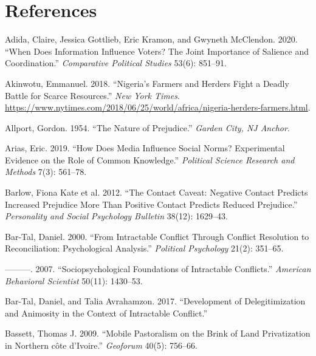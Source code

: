 \documentclass[11pt]{article}
\begin{document}
\hypertarget{references}{%
\section*{References}\label{references}}

\hypertarget{refs}{}
\begin{cslreferences}
\leavevmode\hypertarget{ref-adida2020does}{}%
Adida, Claire, Jessica Gottlieb, Eric Kramon, and Gwyneth McClendon.
2020. ``When Does Information Influence Voters? The Joint Importance of
Salience and Coordination.'' \emph{Comparative Political Studies} 53(6):
851--91.

\leavevmode\hypertarget{ref-nyt2018nigeria}{}%
Akinwotu, Emmanuel. 2018. ``Nigeria's Farmers and Herders Fight a Deadly
Battle for Scarce Resources.'' \emph{New York Times}.
\url{https://www.nytimes.com/2018/06/25/world/africa/nigeria-herders-farmers.html}.

\leavevmode\hypertarget{ref-allport1954prejudice}{}%
Allport, Gordon. 1954. ``The Nature of Prejudice.'' \emph{Garden City,
NJ Anchor}.

\leavevmode\hypertarget{ref-arias2019does}{}%
Arias, Eric. 2019. ``How Does Media Influence Social Norms? Experimental
Evidence on the Role of Common Knowledge.'' \emph{Political Science
Research and Methods} 7(3): 561--78.

\leavevmode\hypertarget{ref-barlow2012contact}{}%
Barlow, Fiona Kate et al. 2012. ``The Contact Caveat: Negative Contact
Predicts Increased Prejudice More Than Positive Contact Predicts Reduced
Prejudice.'' \emph{Personality and Social Psychology Bulletin} 38(12):
1629--43.

\leavevmode\hypertarget{ref-bar2000intractable}{}%
Bar-Tal, Daniel. 2000. ``From Intractable Conflict Through Conflict
Resolution to Reconciliation: Psychological Analysis.'' \emph{Political
Psychology} 21(2): 351--65.

\leavevmode\hypertarget{ref-bar2007sociopsychological}{}%
---------. 2007. ``Sociopsychological Foundations of Intractable
Conflicts.'' \emph{American Behavioral Scientist} 50(11): 1430--53.

\leavevmode\hypertarget{ref-bar2017development}{}%
Bar-Tal, Daniel, and Talia Avrahamzon. 2017. ``Development of
Delegitimization and Animosity in the Context of Intractable Conflict.''

\leavevmode\hypertarget{ref-bassett2009mobile}{}%
Bassett, Thomas J. 2009. ``Mobile Pastoralism on the Brink of Land
Privatization in Northern côte d'Ivoire.'' \emph{Geoforum} 40(5):
756--66.


\end{cslreferences}
\end{document}
